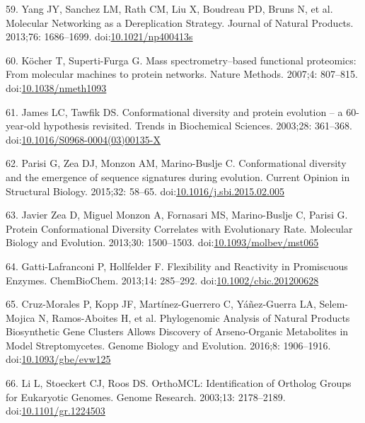 \documentclass[12pt,twoside]{reedthesis}
\begin{document}
  \hypertarget{ref-yangux5fmolecularux5f2013}{}
  59. Yang JY, Sanchez LM, Rath CM, Liu X, Boudreau PD, Bruns N, et al.
  Molecular Networking as a Dereplication Strategy. Journal of Natural
  Products. 2013;76: 1686--1699.
  doi:\href{https://doi.org/10.1021/np400413s}{10.1021/np400413s}
  
  \hypertarget{ref-kocherux5fmassux5f2007}{}
  60. Köcher T, Superti-Furga G. Mass spectrometry--based functional
  proteomics: From molecular machines to protein networks. Nature Methods.
  2007;4: 807--815.
  doi:\href{https://doi.org/10.1038/nmeth1093}{10.1038/nmeth1093}
  
  \hypertarget{ref-jamesux5fconformationalux5f2003}{}
  61. James LC, Tawfik DS. Conformational diversity and protein evolution
  -- a 60-year-old hypothesis revisited. Trends in Biochemical Sciences.
  2003;28: 361--368.
  doi:\href{https://doi.org/10.1016/S0968-0004(03)00135-X}{10.1016/S0968-0004(03)00135-X}
  
  \hypertarget{ref-parisiux5fconformationalux5f2015}{}
  62. Parisi G, Zea DJ, Monzon AM, Marino-Buslje C. Conformational
  diversity and the emergence of sequence signatures during evolution.
  Current Opinion in Structural Biology. 2015;32: 58--65.
  doi:\href{https://doi.org/10.1016/j.sbi.2015.02.005}{10.1016/j.sbi.2015.02.005}
  
  \hypertarget{ref-javierux5fzeaux5fproteinux5f2013}{}
  63. Javier Zea D, Miguel Monzon A, Fornasari MS, Marino-Buslje C, Parisi
  G. Protein Conformational Diversity Correlates with Evolutionary Rate.
  Molecular Biology and Evolution. 2013;30: 1500--1503.
  doi:\href{https://doi.org/10.1093/molbev/mst065}{10.1093/molbev/mst065}
  
  \hypertarget{ref-gatti-lafranconiux5fflexibilityux5f2013}{}
  64. Gatti-Lafranconi P, Hollfelder F. Flexibility and Reactivity in
  Promiscuous Enzymes. ChemBioChem. 2013;14: 285--292.
  doi:\href{https://doi.org/10.1002/cbic.201200628}{10.1002/cbic.201200628}
  
  \hypertarget{ref-cruz-moralesux5fphylogenomicux5f2016}{}
  65. Cruz-Morales P, Kopp JF, Martínez-Guerrero C, Yáñez-Guerra LA,
  Selem-Mojica N, Ramos-Aboites H, et al. Phylogenomic Analysis of Natural
  Products Biosynthetic Gene Clusters Allows Discovery of Arseno-Organic
  Metabolites in Model Streptomycetes. Genome Biology and Evolution.
  2016;8: 1906--1916.
  doi:\href{https://doi.org/10.1093/gbe/evw125}{10.1093/gbe/evw125}
  
  \hypertarget{ref-liux5forthomclux5f2003}{}
  66. Li L, Stoeckert CJ, Roos DS. OrthoMCL: Identification of Ortholog
  Groups for Eukaryotic Genomes. Genome Research. 2003;13: 2178--2189.
  doi:\href{https://doi.org/10.1101/gr.1224503}{10.1101/gr.1224503}
  
\end{document}

